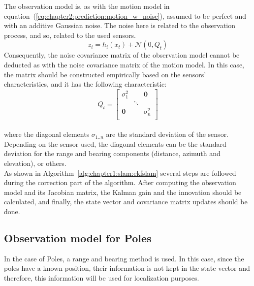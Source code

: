 The observation model is, as with the motion model in equation~(\ref{eq:chapter2:prediction:motion_w_noise}), assumed to be perfect and with an additive Gaussian noise. The noise here is related to the observation process, and so, related to the used sensors.
\begin{equation}
    z_i = h_i\left(x_t\right) + \mathcal{N}\left(0, Q_t\right)
    \label{eq:chapter2:correction:obs_w_noise}
\end{equation}
Consequently, the noise covariance matrix of the observation model cannot be deducted as with the noise covariance matrix of the motion model. In this case, the matrix should be constructed empirically based on the sensors' characteristics, and it has the following characteristic:
\begin{equation}
    Q_t = \begin{bmatrix}
        \sigma_1^2 &  & \textbf{0} \\
         & \ddots & \\
        \textbf{0} & & \sigma_n^2 \\
    \end{bmatrix}
\end{equation}\\
where the diagonal elements $\sigma_{1..n}$ are the standard deviation of the sensor. Depending on the sensor used, the diagonal elements can be the standard deviation for the range and bearing components (distance, azimuth and elevation), or others.\\

As shown in Algorithm~\ref{alg:chapter1:slam:ekfslam} several steps are followed during the correction part of the algorithm. After computing the observation model and its Jacobian matrix, the Kalman gain and the innovation should be calculated, and finally, the state vector and covariance matrix updates should be done.

\subsection{Observation model for Poles}
\label{subsec:chapter2:correction:poles}
In the case of Poles, a range and bearing method is used. In this case, since the poles have a known position, their information is not kept in the state vector and therefore, this information will be used for localization purposes.\\

